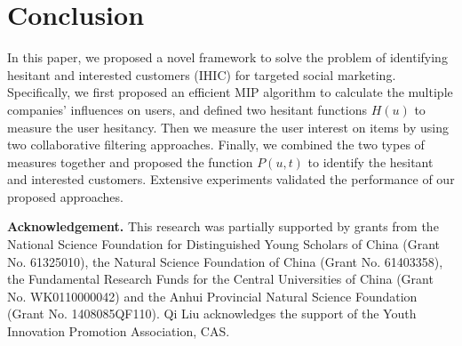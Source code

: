 \documentclass{llncs}
\begin{document}
\vspace*{-0.3cm}
\section{Conclusion}
\vspace*{-0.4cm}
In this paper, we proposed a novel framework to solve the problem of identifying hesitant and interested customers (IHIC) for targeted social marketing.
Specifically, we first proposed an efficient MIP algorithm to calculate the multiple companies' influences on users, and defined two hesitant functions $H(u)$ to measure the user hesitancy. Then we measure the user interest on items
by using two collaborative filtering approaches. Finally, we combined the two types of measures together and proposed the function $P(u,t)$ to identify the hesitant and interested customers. Extensive experiments validated the performance of our proposed approaches. 

\vspace*{0.2cm}
\noindent
\textbf{Acknowledgement.} This research was partially supported by grants from the National Science Foundation for Distinguished Young Scholars of China (Grant No. 61325010), the Natural Science Foundation of China (Grant No. 61403358), the Fundamental Research Funds for the Central Universities of China (Grant No. WK0110000042) and the Anhui Provincial Natural Science Foundation (Grant No. 1408085QF110). Qi Liu acknowledges the support of the Youth Innovation Promotion Association, CAS.

\vspace*{-0.1cm}



\end{document}
